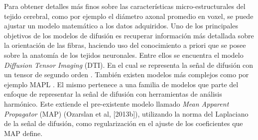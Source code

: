 \documentclass[a4paper,10pt]{article}
\begin{document}
Para obtener detalles más finos sobre las características micro-estructurales del tejido cerebral, como por ejemplo el 
diámetro axonal promedio en voxel, se puede ajustar un modelo matemático a los datos adquiridos. Uno de los principales 
objetivos de los modelos de difusión es recuperar información más detallada sobre la orientación de las fibras, haciendo 
uso del conocimiento a priori que se posee sobre la anatomía de los tejidos neuronales. Entre ellos se 
encuentra el modelo \textit{Diffusion Tensor Imaging} (DTI). En el cual se representa la 
se\~nal de difusión con un tensor de segundo orden \citep{Basser1994}. También existen modelos más 
complejos como por ejemplo MAPL \citep{Fick2016365}. El mismo pertenece a una familia de modelos que parte del enfoque 
de representar la señal de difusión con herramientas de análisis harmónico.
Este extiende el pre-existente modelo llamado \textit{Mean Apparent Propagator} (MAP) (Ozarslan et al, [2013b]), 
utilizando la norma del Laplaciano de la se\~nal de difusión, como regularizaci\'on en el ajuste de los coeficientes 
que MAP define. 


\end{document}
